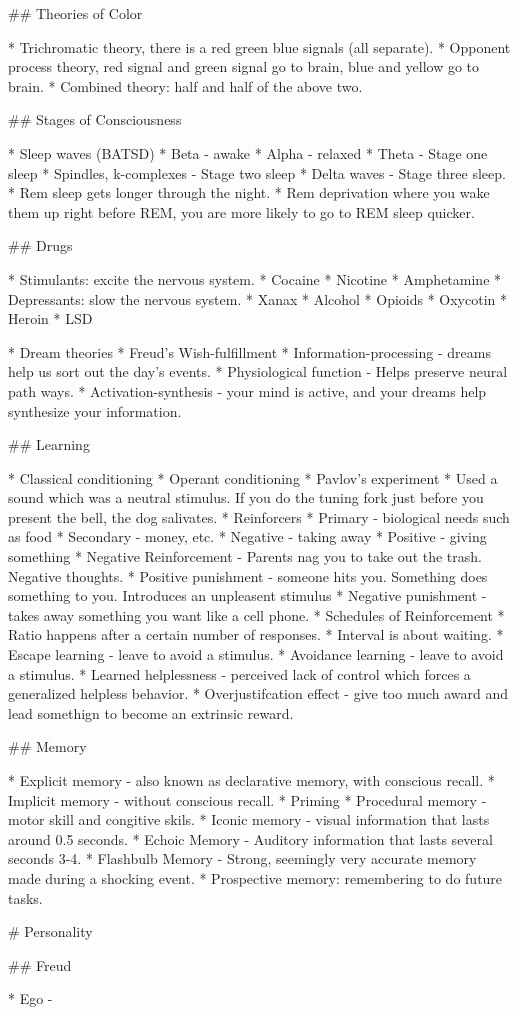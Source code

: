 \documentclass{article}
\begin{document}
\begin{markdown}
## Theories of Color

* Trichromatic theory, there is a red green blue signals (all separate).
* Opponent process theory, red signal and green signal go to brain, blue and yellow go to brain.
* Combined theory: half and half of the above two.

## Stages of Consciousness

* Sleep waves (BATSD)
	* Beta - awake
	* Alpha - relaxed
	* Theta - Stage one sleep
	* Spindles, k-complexes - Stage two sleep
	* Delta waves - Stage three sleep.
* Rem sleep gets longer through the night.
* Rem deprivation where you wake them up right before REM, you are more likely to go to REM sleep quicker.

## Drugs

* Stimulants: excite the nervous system.
	* Cocaine
	* Nicotine
	* Amphetamine
* Depressants: slow the nervous system.
	* Xanax
	* Alcohol
	* Opioids
	* Oxycotin
	* Heroin
	* LSD

* Dream theories
	* Freud's Wish-fulfillment
	* Information-processing - dreams help us sort out the day's events.
	* Physiological function - Helps preserve neural path ways.
	* Activation-synthesis - your mind is active, and your dreams help synthesize your information.

## Learning

* Classical conditioning
* Operant conditioning
* Pavlov's experiment
	* Used a sound which was a neutral stimulus. If you do the tuning fork just before you present the bell, the dog salivates.
* Reinforcers
	* Primary - biological needs such as food
	* Secondary - money, etc.
* Negative - taking away
* Positive - giving something
* Negative Reinforcement - Parents nag you to take out the trash. Negative thoughts.
* Positive punishment - someone hits you. Something does something to you. Introduces an unpleasent stimulus
* Negative punishment - takes away something you want like a cell phone.
* Schedules of Reinforcement
	* Ratio happens after a certain number of responses.
	* Interval is about waiting.
* Escape learning - leave to avoid a stimulus.
* Avoidance learning - leave to avoid a stimulus.
* Learned helplessness - perceived lack of control which forces a generalized helpless behavior.
* Overjustifcation effect - give too much award and lead somethign to become an extrinsic reward.

## Memory

* Explicit memory - also known as declarative memory, with conscious recall.
* Implicit memory - without conscious recall.
* Priming
* Procedural memory - motor skill and congitive skils.
* Iconic memory - visual information that lasts around 0.5 seconds.
* Echoic Memory - Auditory information that lasts several seconds 3-4. 
* Flashbulb Memory - Strong, seemingly very accurate memory made during a shocking event.
* Prospective memory: remembering to do future tasks.

# Personality

## Freud

* Ego -

\end{markdown}
\end{document}
